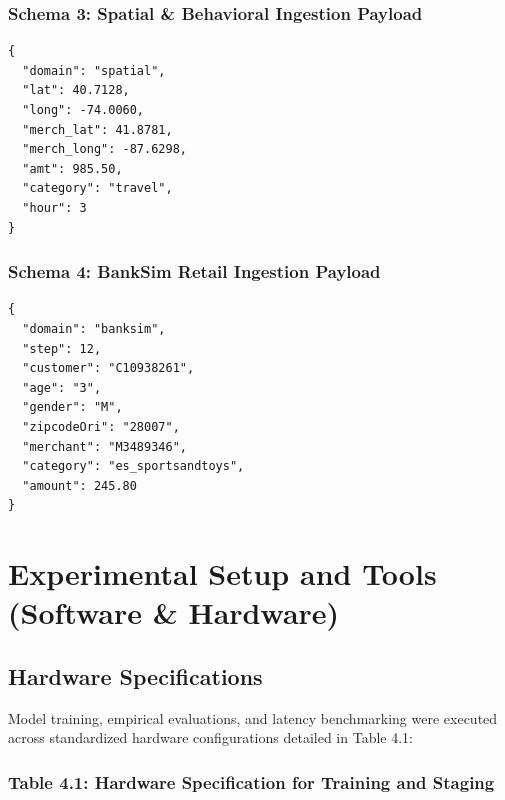 \documentclass[12pt,a4paper,oneside]{report}
\begin{document}
\subsubsection{Schema 3: Spatial \& Behavioral Ingestion Payload}
\begin{lstlisting}
{
  "domain": "spatial",
  "lat": 40.7128,
  "long": -74.0060,
  "merch_lat": 41.8781,
  "merch_long": -87.6298,
  "amt": 985.50,
  "category": "travel",
  "hour": 3
}
\end{lstlisting}

\subsubsection{Schema 4: BankSim Retail Ingestion Payload}
\begin{lstlisting}
{
  "domain": "banksim",
  "step": 12,
  "customer": "C10938261",
  "age": "3",
  "gender": "M",
  "zipcodeOri": "28007",
  "merchant": "M3489346",
  "category": "es_sportsandtoys",
  "amount": 245.80
}
\end{lstlisting}


\section{Experimental Setup and Tools (Software \& Hardware)}

\subsection{Hardware Specifications}

Model training, empirical evaluations, and latency benchmarking were executed across standardized hardware configurations detailed in Table 4.1:


\subsubsection{Table 4.1: Hardware Specification for Training and Staging}
\end{document}
